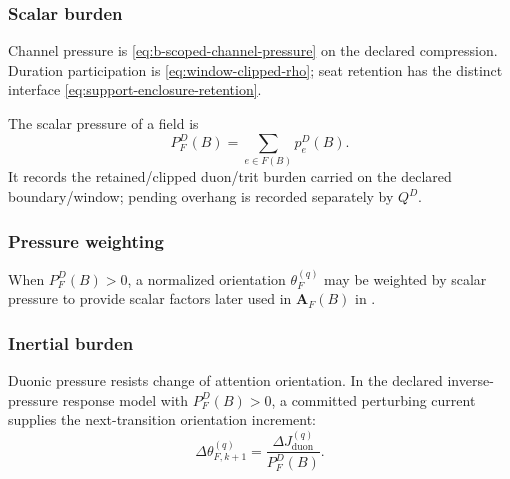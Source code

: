 \subsubsection{Scalar burden}\label{subsec:duonic-pressure-scalar-burden}
\begin{definition}
Channel pressure is \eqref{eq:b-scoped-channel-pressure} on the declared
compression. Duration participation is \eqref{eq:window-clipped-rho};
seat retention has the distinct interface \eqref{eq:support-enclosure-retention}.
\end{definition}
\begin{definition}
The scalar pressure of a field is
\begin{equation}
P^D_F(B)=
\sum_{e\in F(B)}p^D_e(B).
\label{eq:duonic-pressure}
\end{equation}
It records the retained/clipped duon/trit burden carried on the declared boundary/window; pending overhang is recorded separately by \(Q^D\).
\end{definition}

\subsubsection{Pressure weighting}\label{subsec:duonic-pressure-weighting}
When \(P^D_F(B)>0\), a normalized orientation \(\theta_F^{(q)}\) may be weighted by scalar pressure to provide scalar factors later used in \(\mathbf A_F(B)\) in .

\subsubsection{Inertial burden}\label{subsec:inertial-burden}
Duonic pressure resists change of attention orientation. In the declared inverse-pressure response model with \(P^D_F(B)>0\), a committed perturbing current supplies the next-transition orientation increment:
\[
\Delta\theta_{F,k+1}^{(q)}=
\frac{\Delta J_{\mathrm{duon}}^{(q)}}{P^D_F(B)}.
\]




